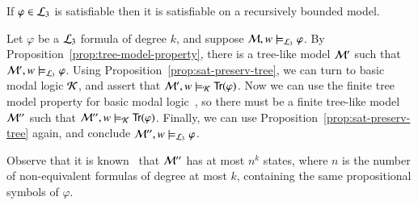 \begin{thm}\label{thm:fmp}
If $\varphi\in\mathcal{L}_3$ is satisfiable then it is satisfiable on a
recursively bounded model.
\end{thm}

\begin{pf}
Let $\varphi$ be a $\mathcal{L}_3$ formula of degree $k$, and suppose
$\mathcal{M},w \models_{\mathcal{L}_3} \varphi$. By
Proposition~\ref{prop:tree-model-property}, there is a tree-like
model $\mathcal{M}'$ such that $\mathcal{M}',w \models_{\mathcal{L}_3} \varphi$.
Using Proposition~\ref{prop:sat-preserv-tree}, we can turn to basic
modal logic $\mathcal{K}$, and assert that $\mathcal{M}',w \models_{\mathcal{K}}
{\sf Tr}(\varphi)$. Now we can use the finite tree model property for
basic modal logic~\cite{BRV01}, so there must be a finite tree-like
model $\mathcal{M}''$ such that $\mathcal{M}'',w \models_{\mathcal{K}} {\sf Tr}(\varphi)$.
Finally, we can use Proposition~\ref{prop:sat-preserv-tree} again,
and conclude $\mathcal{M}'',w \models_{\mathcal{L}_3} \varphi$.

Observe that it is known~\cite{BRV01} that $\mathcal{M}''$ has at most
$n^k$ states, where $n$ is the number of non-equivalent formulas of
degree at most $k$, containing the same propositional symbols of
$\varphi$.
\end{pf}





